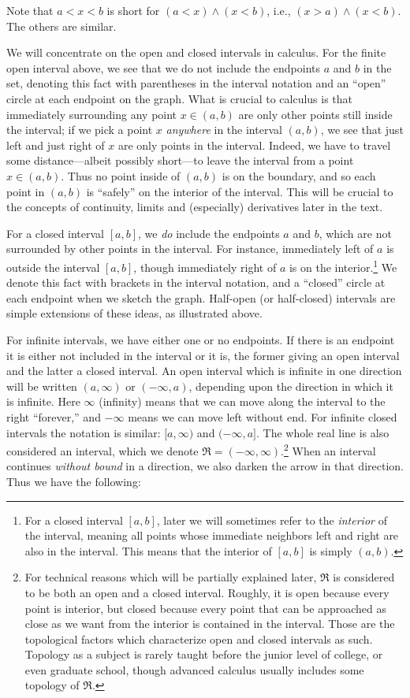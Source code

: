 \medskip
\noindent Note that $a<x<b$ is short for $(a<x)\wedge(x<b)$, i.e.,
$(x>a)\wedge(x<b)$.  The others are similar.


We will concentrate on the open and closed intervals in 
calculus.  For the finite open interval above, 
we see that we do not include the endpoints $a$ and $b$ in the set, 
denoting
this fact with parentheses in the interval notation and an ``open''
circle at each endpoint on the graph.  What is crucial to calculus is
that immediately surrounding any point $x\in(a,b)$ are only
other points still inside
the interval;  if we pick a point $x$ {\it anywhere} in the interval $(a,b)$,
we see that just left and just right of $x$ are only points in the
interval.  Indeed, we have to travel some distance---albeit possibly
short---to leave the interval from a point $x\in(a,b)$.
 Thus no point inside of $(a,b)$ is on the boundary, and so each point
in $(a,b)$ is ``safely'' on the interior of the interval.
This will be crucial to the concepts of continuity, limits
and (especially) derivatives later in the text.  

For a closed interval
$[a,b]$, we {\it do} include the endpoints $a$ and $b$, which
are not surrounded  by other points in the interval.  For instance,
immediately left of $a$ is outside the interval $[a,b]$, 
though immediately right
of $a$ is on the interior.\footnote{%
For a closed interval $[a,b]$, later we will sometimes refer to the 
{\it interior} of the interval, meaning all points whose
immediate neighbors left and right are also in the interval.
This means that the interior of $[a,b]$ is simply $(a,b)$.
}  We denote this
fact with brackets in the interval notation, and a ``closed'' circle
at each endpoint when we sketch the graph. 
Half-open (or half-closed) intervals are simple extensions of
these ideas, as illustrated above.

For infinite intervals, we have either one or no endpoints.
If there is an endpoint it is either not included in the interval
or it is, the former giving an open interval and the latter a closed
interval.
An open interval which is infinite in one direction will
be written $(a,\infty)$ or $(-\infty,a)$, depending upon the
direction in which it is infinite.  Here $\infty$ {(infinity)}
means
that we can move along the interval to the right ``forever,''
and $-\infty$ means we can move left without end.  
For infinite closed intervals the notation is similar: 
$[a,\infty)$ and $(-\infty,a]$.
The whole real line is also considered an interval,
which we denote $\Re=(-\infty,\infty)$.\footnote{%
For technical reasons which will be partially explained later,
$\Re$ is considered to be both an open and a closed interval.
Roughly, it is open because every point is interior, but 
closed because every point that can be approached as close
as we want from the interior is contained in the interval.
Those are the topological factors which characterize open and
closed intervals as such. Topology as a subject is rarely taught
before the junior level of college, or even graduate school,
though advanced calculus usually includes some topology of $\Re$.
}  When an interval
continues {\it without bound} in a direction, we also darken
the arrow in that direction.  Thus we have the following:


